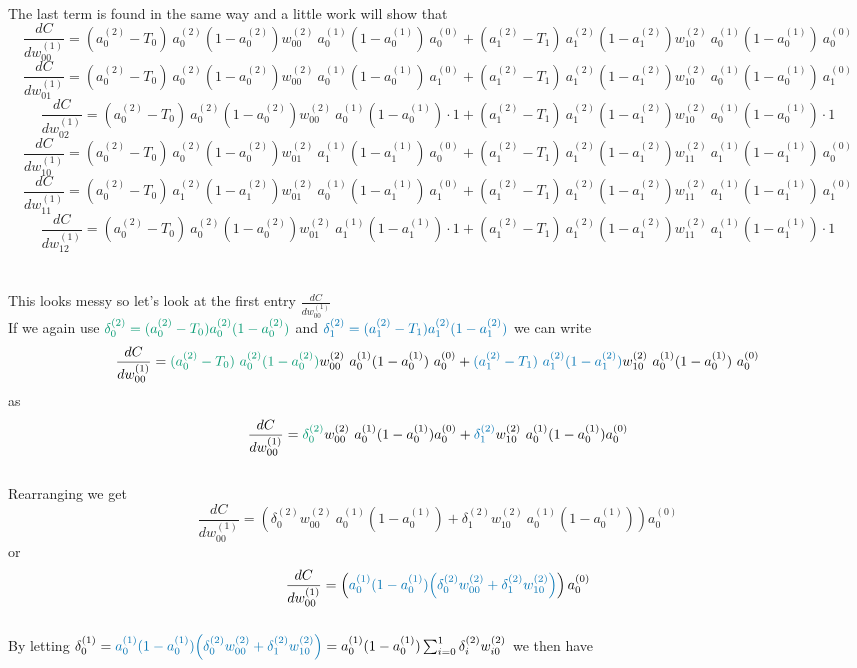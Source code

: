 \documentclass{article}
\begin{document}
\\
The last term is found in the same way and a little work will show that
$$\frac{dC}{dw_{00}^{(1)}} = (a_0^{(2)}-T_0)~a_0^{(2)}(1-a_0^{(2)})w_{00}^{(2)}~a_0^{(1)}(1-a_0^{(1)})~a_0^{(0)} + (a_1^{(2)}-T_1)~a_1^{(2)}(1-a_1^{(2)})w_{10}^{(2)}~a_0^{(1)}(1-a_0^{(1)})~a_0^{(0)}$$
$$\frac{dC}{dw_{01}^{(1)}} = (a_0^{(2)}-T_0)~a_0^{(2)}(1-a_0^{(2)})w_{00}^{(2)}~a_0^{(1)}(1-a_0^{(1)})~a_1^{(0)} + (a_1^{(2)}-T_1)~a_1^{(2)}(1-a_1^{(2)})w_{10}^{(2)}~a_0^{(1)}(1-a_0^{(1)})~a_1^{(0)}$$
$$\frac{dC}{dw_{02}^{(1)}} = (a_0^{(2)}-T_0)~a_0^{(2)}(1-a_0^{(2)})w_{00}^{(2)}~a_0^{(1)}(1-a_0^{(1)})\cdot 1 + (a_1^{(2)}-T_1)~a_1^{(2)}(1-a_1^{(2)})w_{10}^{(2)}~a_0^{(1)}(1-a_0^{(1)})\cdot 1$$
$$\frac{dC}{dw_{10}^{(1)}} = (a_0^{(2)}-T_0)~a_0^{(2)}(1-a_0^{(2)})w_{01}^{(2)}~a_1^{(1)}(1-a_1^{(1)})~a_0^{(0)} + (a_1^{(2)}-T_1)~a_1^{(2)}(1-a_1^{(2)})w_{11}^{(2)}~a_1^{(1)}(1-a_1^{(1)})~a_0^{(0)}$$
$$\frac{dC}{dw_{11}^{(1)}} = (a_0^{(2)}-T_0)~a_1^{(2)}(1-a_1^{(2)})w_{01}^{(2)}~a_0^{(1)}(1-a_1^{(1)})~a_1^{(0)} + (a_1^{(2)}-T_1)~a_1^{(2)}(1-a_1^{(2)})w_{11}^{(2)}~a_1^{(1)}(1-a_1^{(1)})~a_1^{(0)}$$
$$\frac{dC}{dw_{12}^{(1)}} = (a_0^{(2)}-T_0)~a_0^{(2)}(1-a_0^{(2)})w_{01}^{(2)}~a_1^{(1)}(1-a_1^{(1)})\cdot 1 + (a_1^{(2)}-T_1)~a_1^{(2)}(1-a_1^{(2)})w_{11}^{(2)}~a_1^{(1)}(1-a_1^{(1)})\cdot 1$$
\\
\\
This looks messy so let's look at the first entry $\frac{dC}{dw_{00}^{(1)}}$
\\
If we again use $\textcolor{green}{\delta_0^{(2)} = (a_0^{(2)}-T_0)a_0^{(2)}(1-a_0^{(2)})}$ and $\textcolor{darkblue}{\delta_1^{(2)} = (a_1^{(2)}-T_1)a_1^{(2)}(1-a_1^{(2)})}$ we can write
$$\frac{dC}{dw_{00}^{(1)}} = \textcolor{green}{(a_0^{(2)}-T_0)~a_0^{(2)}(1-a_0^{(2)})}w_{00}^{(2)}~a_0^{(1)}(1-a_0^{(1)})~a_0^{(0)} + \textcolor{darkblue}{(a_1^{(2)}-T_1)~a_1^{(2)}(1-a_1^{(2)})}w_{10}^{(2)}~a_0^{(1)}(1-a_0^{(1)})~a_0^{(0)}$$
as
$$\frac{dC}{dw_{00}^{(1)}} = \textcolor{green}{\delta_0^{(2)}}w_{00}^{(2)}~a_0^{(1)}(1-a_0^{(1)})a_0^{(0)} + \textcolor{darkblue}{\delta_1^{(2)}}w_{10}^{(2)}~a_0^{(1)}(1-a_0^{(1)})a_0^{(0)}$$
\\
Rearranging we get
 $$\frac{dC}{dw_{00}^{(1)}} = \left({\delta_0^{(2)}w_{00}^{(2)}~a_0^{(1)}(1-a_0^{(1)}) + \delta_1^{(2)}w_{10}^{(2)}~a_0^{(1)}(1-a_0^{(1)})}\right) a_0^{(0)}$$
or
 $$\frac{dC}{dw_{00}^{(1)}} = \left(\textcolor{darkblue}{a_0^{(1)}(1-a_0^{(1)}){\left({\delta_0^{(2)}w_{00}^{(2)} + \delta_1^{(2)}w_{10}^{(2)}}\right)}}\right) a_0^{(0)}$$
\\
By letting $\delta_0^{(1)} = \textcolor{darkblue}{a_0^{(1)}(1-a_0^{(1)}){\left({\delta_0^{(2)}w_{00}^{(2)} + \delta_1^{(2)}w_{10}^{(2)}}\right)}} = a_0^{(1)}(1-a_0^{(1)})\sum_{i=0}^{1}\delta_i^{(2)}w_{i0}^{(2)}$ we then have
\end{document}
